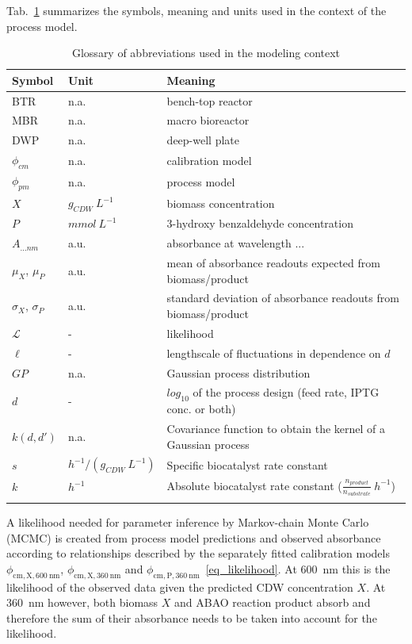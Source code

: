 \documentclass[sn-standardnature]{sn-jnl}%
\theoremstyle{thmstyleone}%
\theoremstyle{thmstyletwo}%
\theoremstyle{thmstylethree}%
\begin{document}
Tab.~\ref{tab_abbreviations} summarizes the symbols, meaning and units used in the context of the process model.


\begin{table}[h]
    \begin{center}
    \begin{minipage}{\textwidth}
    \caption{Glossary of abbreviations used in the modeling context}
    \label{tab_abbreviations}
    \begin{tabular}{@{}lll@{}}
\toprule
Symbol & Unit  & Meaning\\
\midrule
BTR & n.a. & bench-top reactor\\
MBR & n.a. & macro bioreactor\\
DWP & n.a. & deep-well plate\\
$\phi_{cm}$ & n.a. & calibration model\\
$\phi_{pm}$ & n.a. & process model\\
$X$ & $g_{CDW}\ L^{-1}$ & biomass concentration\\
$P$ & $mmol\ L^{-1}$ & 3-hydroxy benzaldehyde concentration\\
$A_{... nm}$ & a.u. & absorbance at wavelength ...\\
$\mu_X$, $\mu_P$ & a.u. & mean of absorbance readouts expected from biomass/product\\
$\sigma_X$, $\sigma_P$ & a.u. & standard deviation of absorbance readouts from biomass/product\\
$\mathcal{L}$ & - & likelihood\\
$\ell$ & - & lengthscale of fluctuations in dependence on $d$\\
$GP$ & n.a. & Gaussian process distribution\\
$d$ & - & $log_{10}$ of the process design (feed rate, IPTG conc. or both)\\
$k(d, d')$ & n.a. & Covariance function to obtain the kernel of a Gaussian process\\
$s$ & $h^{-1}/(g_{CDW}\ L^{-1})$ & Specific biocatalyst rate constant\\
$k$ & $h^{-1}$ & Absolute biocatalyst rate constant ($\frac{n_{product}}{n_{substrate}}\ h^{-1}$)\\
\botrule
    \end{tabular}
    \end{minipage}
    \end{center}
\end{table}

A likelihood needed for parameter inference by Markov-chain Monte Carlo (MCMC) is created from process model predictions and observed absorbance according to relationships described by the separately fitted calibration models $\phi_\mathrm{cm,X,600\ nm}$, $\phi_\mathrm{cm,X,360\ nm}$ and $\phi_\mathrm{cm,P,360\ nm}$~\eqref{eq_likelihood}.
At 600~nm this is the likelihood of the observed data given the predicted CDW concentration $X$.
At 360~nm however, both biomass $X$ and ABAO reaction product absorb and therefore the sum of their absorbance needs to be taken into account for the likelihood.
\end{document}
